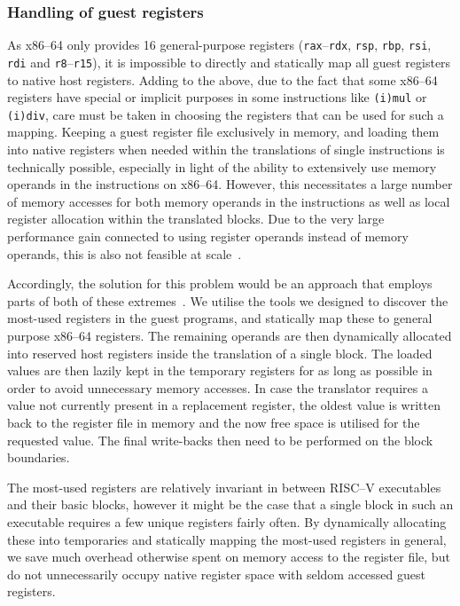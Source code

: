 \subsubsection{Handling of guest registers}
\label{sec:reg-handle}
As x86--64 only provides 16 general-purpose registers (\texttt{rax}--\texttt{rdx}, \texttt{rsp}, \texttt{rbp}, \texttt{rsi}, \texttt{rdi} and \texttt{r8}--\texttt{r15}), it is impossible to directly and statically map all guest registers to native host registers.
Adding to the above, due to the fact that some x86--64 registers have special or implicit purposes in some instructions like \texttt{(i)mul} or \texttt{(i)div}, care must be taken in choosing the registers that can be used for such a mapping.
Keeping a guest register file exclusively in memory, and loading them into native registers when needed within the translations of single instructions is technically possible, especially in light of the ability to extensively use memory operands in the instructions on x86--64.
However, this necessitates a large number of memory accesses for both memory operands in the instructions as well as local register allocation within the translated blocks.
Due to the very large performance gain connected to using register operands instead of memory operands, this is also not feasible at scale~\cite[S. 8f.]{bintrans}.

Accordingly, the solution for this problem would be an approach that employs parts of both of these extremes~\cite[S. 9]{bintrans}.
We utilise the tools we designed to discover the most-used registers in the guest programs, and statically map these to general purpose x86--64 registers.
The remaining operands are then dynamically allocated into reserved host registers inside the translation of a single block.
The loaded values are then lazily kept in the temporary registers for as long as possible in order to avoid unnecessary memory accesses.
In case the translator requires a value not currently present in a replacement register, the oldest value is written back to the register file in memory and the now free space is utilised for the requested value.
The final write-backs then need to be performed on the block boundaries.

The most-used registers are relatively invariant in between RISC--V executables and their basic blocks, however it might be the case that a single block in such an executable requires a few unique registers fairly often.
By dynamically allocating these into temporaries and statically mapping the most-used registers in general, we save much overhead otherwise spent on memory access to the register file, but do not unnecessarily occupy native register space with seldom accessed guest registers.

